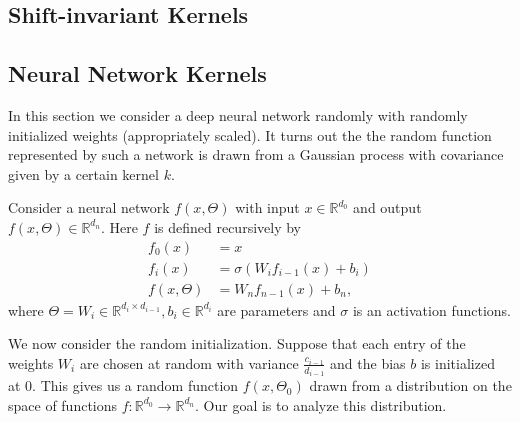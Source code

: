 \subsection{Shift-invariant Kernels}

\subsection{Neural Network Kernels}
In this section we consider a deep neural network randomly with randomly initialized weights (appropriately scaled). It turns out the the random function represented by such a network is drawn from a Gaussian process with covariance given by a certain kernel $k$.

Consider a neural network $f(x,\Theta)$ with input $x\in \mathbb{R}^{d_0}$ and output $f(x,\Theta)\in \mathbb{R}^{d_n}$. Here $f$ is defined recursively by 
\begin{equation}
\begin{split}
 f_0(x) &= x \\
 f_i(x) &= \sigma(W_if_{i-1}(x) + b_i) \\
 f(x,\Theta) &= W_nf_{n-1}(x) + b_n,
 \end{split}
\end{equation}
where $\Theta = W_i\in \mathbb{R}^{d_i\times d_{i-1}}, b_i\in \mathbb{R}^{d_i}$ are parameters and $\sigma$ is an activation functions. 

We now consider the random initialization. Suppose that each entry of the weights $W_i$ are chosen at random with variance $\frac{c_{i-1}}{d_{i-1}}$ and the bias $b$ is initialized at $0$. This gives us a random function $f(x,\Theta_0)$ drawn from a distribution on the space of functions $f:\mathbb{R}^{d_0}\rightarrow \mathbb{R}^{d_n}$. Our goal is to analyze this distribution.

